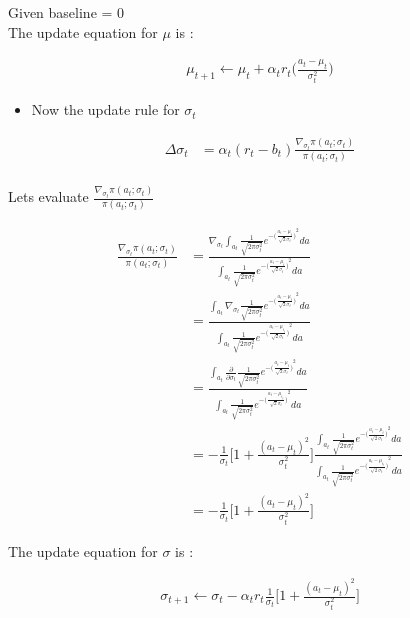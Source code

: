\documentclass [11pt]{article}
\numberwithin{equation}{section}
\begin{document}
Given baseline = 0  \\

The update equation for $\mu$ is :

\begin{align*}
    \mu_{t+1} \leftarrow \mu_{t} + \alpha_t r_t\bigg(\frac{a_t - \mu_t}{\sigma_t^2}\bigg)
\end{align*}

\begin{itemize}
    \item Now the update rule for $\sigma_t$ 
\end{itemize}

\begin{align*}
    \Delta \sigma_t &= \alpha_t(r_t - b_t) \frac{\nabla_{\sigma{_t}} \pi(a_t;\sigma _t)}{\pi(a_t;\sigma_t)} \\
\end{align*} 

Lets evaluate $\frac{\nabla_{\sigma{_t}} \pi(a_t;\sigma_t)}{\pi(a_t;\sigma_t)}$

\begin{align*}
    \frac{\nabla_{\sigma{_t}} \pi(a_t;\sigma_t)}{\pi(a_t;\sigma_t)} &= \frac{ \nabla_{\sigma_t} \int_{a_t}  \frac{1}{\sqrt{2\pi\sigma_t^2}} e^{- {\bigg(\frac{a_t - \mu_t}{\sqrt{2}\sigma_t}\bigg)}^2}da }{\int_{a_t}\frac{1}{\sqrt{2\pi\sigma_t^2}} e^{- {\bigg(\frac{a_t - \mu_t}{\sqrt{2}\sigma_t}\bigg)}^2} da}  \\
    &= \frac{  \int_{a_t} \nabla_{\sigma_t}  \frac{1}{\sqrt{2\pi\sigma_t^2}} e^{- {\bigg(\frac{a_t - \mu_t}{\sqrt{2}\sigma_t}\bigg)}^2}da }{\int_{a_t}\frac{1}{\sqrt{2\pi\sigma_t^2}} e^{- {\bigg(\frac{a_t - \mu_t_t}{\sqrt{2}\sigma_t}\bigg)}^2} da}  \\
    &= \frac{  \int_{a_t} \frac{\partial}{\partial \sigma_t}  \frac{1}{\sqrt{2\pi\sigma_t^2}} e^{- {\bigg(\frac{a_t - \mu_t}{\sqrt{2}\sigma_t}\bigg)}^2}da }{\int_{a_t}\frac{1}{\sqrt{2\pi\sigma_t^2}} e^{- {\bigg(\frac{a_t - \mu_t_t}{\sqrt{2}\sigma_t}\bigg)}^2} da}  \\
    &= -\frac{1}{\sigma_t} \Bigg[ 1 + \frac{(a_t - \mu_t)^2}{\sigma_t^2}\Bigg] \frac{  \int_{a_t}   \frac{1}{\sqrt{2\pi\sigma_t^2}} e^{- {\bigg(\frac{a_t - \mu_t}{\sqrt{2}\sigma_t}\bigg)}^2}da }{\int_{a_t}\frac{1}{\sqrt{2\pi\sigma_t^2}} e^{- {\bigg(\frac{a_t - \mu_t_t}{\sqrt{2}\sigma_t}\bigg)}^2} da} \\
    &=  -\frac{1}{\sigma_t} \Bigg[ 1 + \frac{(a_t - \mu_t)^2}{\sigma_t^2}\Bigg]  
\end{align*} 

The update equation for $\sigma$ is :

\begin{align*}
    \sigma_{t+1} \leftarrow \sigma_{t} - \alpha_t r_t \frac{1}{\sigma_t} \Bigg[ 1 + \frac{(a_t - \mu_t)^2}{\sigma_t^2}\Bigg]  
\end{align*}


\nocite{*}
% 

\end{document}
